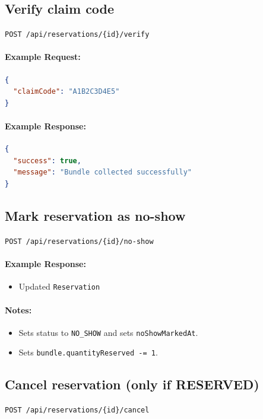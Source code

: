 \documentclass[a4paper,11pt]{article}
\begin{document}
\subsection{Verify claim code}
\texttt{POST /api/reservations/\{id\}/verify}

\paragraph{Example Request:}
\begin{lstlisting}[language=json]
{
  "claimCode": "A1B2C3D4E5"
}
\end{lstlisting}

\paragraph{Example Response:}
\begin{lstlisting}[language=json]
{
  "success": true,
  "message": "Bundle collected successfully"
}
\end{lstlisting}

\subsection{Mark reservation as no-show}
\texttt{POST /api/reservations/\{id\}/no-show}

\paragraph{Example Response:}
\begin{itemize}
    \item Updated \texttt{Reservation}
\end{itemize}

\paragraph{Notes:}
\begin{itemize}
    \item Sets status to \texttt{NO\_SHOW} and sets \texttt{noShowMarkedAt}.
    \item Sets \texttt{bundle.quantityReserved -= 1}.
\end{itemize}

\subsection{Cancel reservation (only if RESERVED)}
\texttt{POST /api/reservations/\{id\}/cancel}
\end{document}
